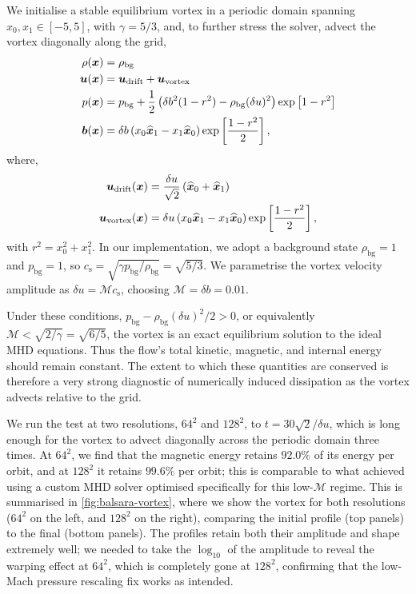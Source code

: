 We initialise a stable equilibrium vortex in a periodic domain spanning $x_0, x_1 \in [-5, 5]$, with $\gamma = 5/3$, and, to further stress the solver, advect the vortex diagonally along the grid,
\begin{align}
    \rho(\bm{x})
        &= \rho_\mathrm{bg} \\
    \bm{u}(\bm{x})
        &= \bm{u}_\mathrm{drift}
            + \bm{u}_\mathrm{vortex} \\
    p(\bm{x})
        &= p_\mathrm{bg} + \frac{1}{2} \left( 
                \delta b^2 (1 - r^2)
                - \rho_\mathrm{bg} (\delta u)^2
             \right) \exp\left[ 1 - r^2 \right] \\
    \bm{b}(\bm{x})
        &= \delta b \left( 
                x_0 \widehat{\bm{x}}_1
                - x_1 \widehat{\bm{x}}_0
             \right) \exp\left[ \frac{1 - r^2}{2} \right]
    ,
\end{align}
where,
\begin{align}
    \bm{u}_\mathrm{drift}(\bm{x})
        &= \frac{\delta u}{\sqrt{2}} \left( 
                \widehat{\bm{x}}_0
                + \widehat{\bm{x}}_1
             \right) \\
    \bm{u}_\mathrm{vortex}(\bm{x})
        &= \delta u \left( 
                x_0 \widehat{\bm{x}}_1
                - x_1 \widehat{\bm{x}}_0
             \right) \exp\left[ \frac{1 - r^2}{2} \right]
        ,
\end{align}
with $r^2 = x_0^2 + x_1^2$. In our implementation, we adopt a background state $\rho_\mathrm{bg} = 1$ and $p_\mathrm{bg} = 1$, so $c_\mathrm{s} = \sqrt{\gamma p_\mathrm{bg} / \rho_\mathrm{bg}} = \sqrt{5/3}$. We parametrise the vortex velocity amplitude as $\delta u = \mathcal{M} c_\mathrm{s}$, choosing $\mathcal{M} = \delta b = 0.01$.

Under these conditions, \ie $p_\mathrm{bg} - \rho_\mathrm{bg} (\delta u)^2 / 2 > 0$, or equivalently $\mathcal{M} < \sqrt{2 / \gamma} = \sqrt{6/5}$, the vortex is an exact equilibrium solution to the ideal MHD equations. Thus the flow's total kinetic, magnetic, and internal energy should remain constant. The extent to which these quantities are conserved is therefore a very strong diagnostic of numerically induced dissipation as the vortex advects relative to the grid.

We run the test at two resolutions, $64^2$ and $128^2$, to $t = 30\sqrt{2}/\delta u$, which is long enough for the vortex to advect diagonally across the periodic domain three times. At $64^2$, we find that the magnetic energy retains $92.0\%$ of its energy per orbit, and at $128^2$ it retains $99.6\%$ per orbit; this is comparable to what \citet{watt2025mitigating} achieved using a custom MHD solver optimised specifically for this low-$\mathcal{M}$ regime. This is summarised in \cref{fig:balsara-vortex}, where we show the vortex for both resolutions ($64^2$ on the left, and $128^2$ on the right), comparing the initial profile (top panels) to the final (bottom panels). The profiles retain both their amplitude and shape extremely well; we needed to take the $\log_{10}$ of the amplitude to reveal the warping effect at $64^2$, which is completely gone at $128^2$, confirming that the \citet{Minoshima21a} low-Mach pressure rescaling fix works as intended.

